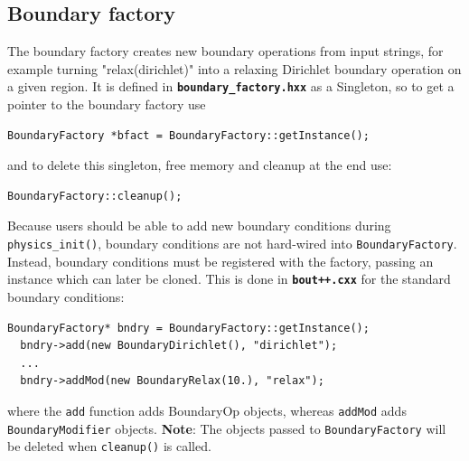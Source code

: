 \documentclass[12pt]{article}
\newcommand{\code}[1]{\texttt{#1}}
\newcommand{\file}[1]{\texttt{\bf #1}}
\begin{document}
\subsection{Boundary factory}
%
\label{sec:BoundaryFactory}
%
%
The boundary factory creates new boundary operations from input strings, for
example turning "relax(dirichlet)" into a relaxing Dirichlet boundary operation
on a given region. It is defined in \file{boundary\_factory.hxx} as a
Singleton, so to get a pointer to the boundary factory use
%
\begin{lstlisting}[numbers=none]
  BoundaryFactory *bfact = BoundaryFactory::getInstance();
\end{lstlisting}
%
and to delete this singleton, free memory and cleanup at the end use:
%
\begin{lstlisting}[numbers=none]
  BoundaryFactory::cleanup();
\end{lstlisting}
%
Because users should be able to add new boundary conditions during
\code{physics\_init()}, boundary conditions are not hard-wired into
\code{BoundaryFactory}. Instead, boundary conditions must be registered with
the factory, passing an instance which can later be cloned. This is done in
\file{bout++.cxx} for the standard boundary conditions:
%
\begin{lstlisting}[firstnumber=258]
  BoundaryFactory* bndry = BoundaryFactory::getInstance();
  bndry->add(new BoundaryDirichlet(), "dirichlet");
  ...
  bndry->addMod(new BoundaryRelax(10.), "relax");
\end{lstlisting}
%
where the \code{add} function adds BoundaryOp objects, whereas \code{addMod}
adds \code{BoundaryModifier} objects. {\bf Note}: The objects passed to
\code{BoundaryFactory} will be deleted when \code{cleanup()} is called.
\end{document}
